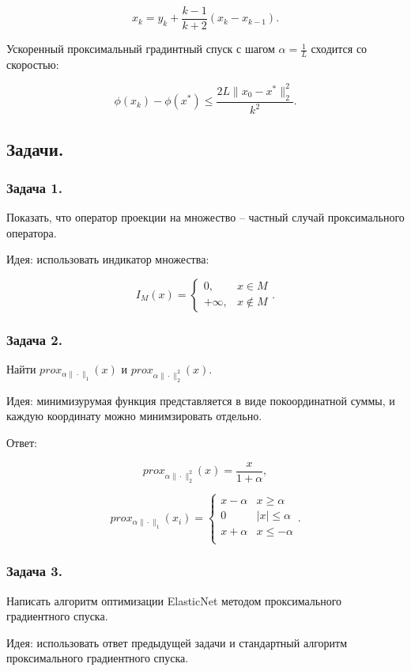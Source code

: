 \begin{equation}
    x_k=y_k+\frac{k-1}{k+2}(x_k-x_{k-1}).
\end{equation}

Ускоренный проксимальный градинтный спуск с шагом $\alpha=\frac1L$ сходится со скоростью:

\begin{equation}
    \phi(x_k)-\phi(x^*)\leq\frac{2L\|x_0-x^*\|_2^2}{k^2}.
\end{equation}

\subsection*{Задачи.}

\subsubsection*{Задача 1.}

Показать, что оператор проекции на множество -- частный случай проксимального оператора.

Идея: использовать индикатор множества:

\begin{equation}
    I_M(x)=\begin{cases}
        0,&x\in M\\
        +\infty,&x\not\in M
    \end{cases}.
\end{equation}

\subsubsection*{Задача 2.}

Найти $prox_{\alpha\|\cdot\|_1}(x)$ и $prox_{\alpha\|\cdot\|_2^2}(x)$.

Идея: минимизурумая функция представляется в виде покоординатной суммы, и каждую координату можно минимзировать отдельно.

Ответ:

\begin{equation}
    prox_{\alpha\|\cdot\|_2^2}(x)=\frac{x}{1+\alpha},
\end{equation}

\begin{equation}
    prox_{\alpha\|\cdot\|_1}(x_i)=\begin{cases}
        x-\alpha&x\geq\alpha\\
        0&|x|\leq\alpha\\
        x+\alpha&x\leq-\alpha\\
    \end{cases}.
\end{equation}

\subsubsection*{Задача 3.}

Написать алгоритм оптимизации ElasticNet методом проксимального градиентного спуска.

Идея: использовать ответ предыдущей задачи и стандартный алгоритм проксимального градиентного спуска.
